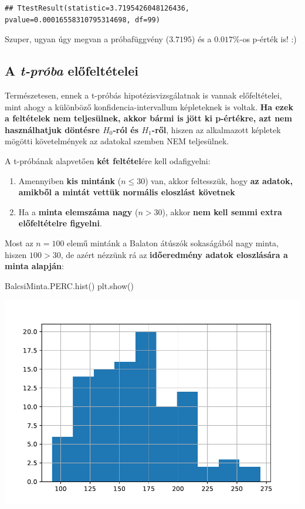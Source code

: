 \documentclass[
]{book}
\newenvironment{Shaded}{\begin{snugshade}}{\end{snugshade}}
\newcommand{\NormalTok}[1]{#1}
\providecommand{\tightlist}{%
  \setlength{\itemsep}{0pt}\setlength{\parskip}{0pt}}
\begin{document}
\begin{verbatim}
## TtestResult(statistic=3.7195426048126436, pvalue=0.00016558310795314698, df=99)
\end{verbatim}

Szuper, ugyan úgy megvan a próbafüggvény (\(3.7195\)) és a \(0.017\%\)-os p-érték is! :)

\subsection{\texorpdfstring{A \emph{t-próba} előfeltételei}{A t-próba előfeltételei}}\label{a-t-pruxf3ba-elux151feltuxe9telei}

Természetesen, ennek a t-próbás hipotézisvizsgálatnak is vannak előfeltételei, mint ahogy a különböző konfidencia-intervallum képleteknek is voltak. \textbf{Ha ezek a feltételek nem teljesülnek, akkor bármi is jött ki p-értékre, azt nem használhatjuk döntésre \(H_0\)-ról és \(H_1\)-ről}, hiszen az alkalmazott képletek mögötti követelmények az adatokal szemben NEM teljesülnek.

A t-próbának alapvetően \textbf{két feltétel}ére kell odafigyelni:

\begin{enumerate}
\def\labelenumi{\arabic{enumi}.}
\tightlist
\item
  Amennyiben \textbf{kis mintánk} (\(n\leq30\)) van, akkor feltesszük, hogy \textbf{az adatok, amikből a mintát vettük normális eloszlást követnek}
\item
  Ha a \textbf{minta elemszáma nagy} (\(n>30\)), akkor \textbf{nem kell semmi extra előfeltételre figyelni}.
\end{enumerate}

Most az \(n=100\) elemű mintánk a Balaton átúszók sokaságából nagy minta, hiszen \(100>30\), de azért nézzünk rá az \textbf{időeredmény adatok eloszlására a minta alapján}:

\begin{Shaded}
\begin{Highlighting}[]
\NormalTok{BalcsiMinta.PERC.hist()}
\NormalTok{plt.show()}
\end{Highlighting}
\end{Shaded}

\includegraphics{_main_files/figure-latex/unnamed-chunk-347-27.pdf}
\end{document}
